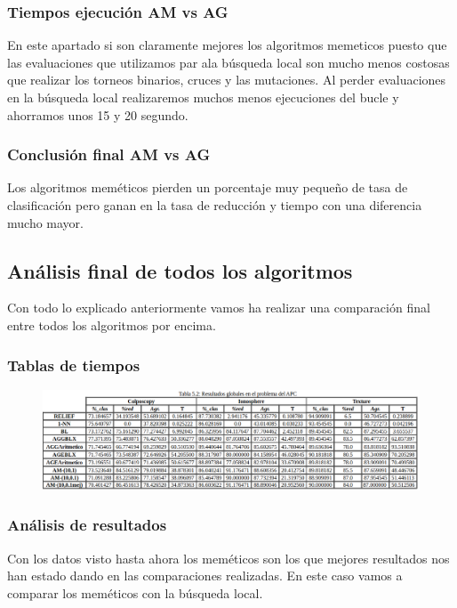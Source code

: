 \documentclass[titlepage]{article}
\begin{document}
	\subsubsection{Tiempos ejecución AM vs AG}
	En este apartado si son claramente mejores los algoritmos memeticos puesto que las evaluaciones que utilizamos par ala búsqueda local son mucho menos costosas que realizar los torneos binarios, cruces y las mutaciones. Al perder evaluaciones en la búsqueda local realizaremos muchos menos ejecuciones del bucle y ahorramos unos 15 y 20 segundo. 
	
	\subsubsection{Conclusión final AM vs AG}
	Los algoritmos meméticos pierden un porcentaje muy pequeño de tasa de clasificación pero ganan en la tasa de reducción y tiempo con una diferencia mucho mayor.
	
	\subsection{Análisis final de todos los algoritmos}
	Con todo lo explicado anteriormente vamos ha realizar una comparación final entre todos los algoritmos por encima.
	\subsubsection{Tablas de tiempos}
	\begin{figure}[H]
		\centering
		\includegraphics[width=1\linewidth]{screenshot011}
		\caption{}
		\label{fig:screenshot011}
	\end{figure}

	\subsubsection{Análisis de resultados}
	Con los datos visto hasta ahora los meméticos son los que mejores resultados nos han estado dando en las comparaciones realizadas. En este caso vamos a comparar los meméticos con la búsqueda local. 
	
\end{document}
